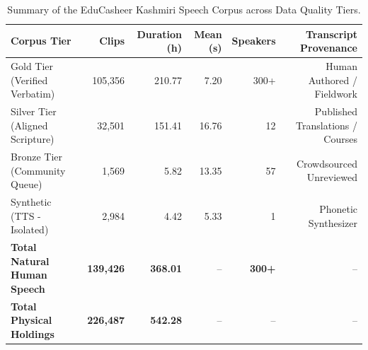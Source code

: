 \begin{table}[t]
\centering\small
\begin{tabular}{lrrrrr}
\hline
\textbf{Corpus Tier} & \textbf{Clips} & \textbf{Duration (h)} & \textbf{Mean (s)} & \textbf{Speakers} & \textbf{Transcript Provenance} \\
\hline
Gold Tier (Verified Verbatim) & 105,356 & 210.77 & 7.20 & 300+ & Human Authored / Fieldwork \\
Silver Tier (Aligned Scripture) & 32,501 & 151.41 & 16.76 & 12 & Published Translations / Courses \\
Bronze Tier (Community Queue) & 1,569 & 5.82 & 13.35 & 57 & Crowdsourced Unreviewed \\
Synthetic (TTS - Isolated) & 2,984 & 4.42 & 5.33 & 1 & Phonetic Synthesizer \\
\hline
\textbf{Total Natural Human Speech} & \textbf{139,426} & \textbf{368.01} & -- & \textbf{300+} & -- \\
\textbf{Total Physical Holdings} & \textbf{226,487} & \textbf{542.28} & -- & -- & -- \\
\hline
\end{tabular}
\caption{Summary of the EduCasheer Kashmiri Speech Corpus across Data Quality Tiers.}
\label{tab:corpus_tiers}
\end{table}
